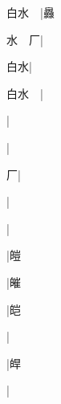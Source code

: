 \begin{multicols}{2}
{{\cjk{}白水{\cnsym{}　}}|{\cjk{}灥}\par
{\cjk{}水{\cnsym{}　}厂}|{}\par
{\cjk{}{\cnsym{}　}白水}|{}\par
{\cjk{}白水{\cnsym{}　}}|{}\par
{\cjk{}{\cnsym{}　}{\cnsym{}　}{\cnsym{}　}}|{}\par
{\cjk{}{\cnsym{}　}{\cnsym{}　}{\cnsym{}　}}|{}\par
{\cjk{}{\cnsym{}　}{\cnsym{}　}厂}|{}\par
{\cjk{}{\cnsym{}　}{\cnsym{}　}{\cnsym{}　}}|{}\par
{\cjk{}{\cnsym{}　}{\cnsym{}　}{\cnsym{}　}}|{}\par
{\cjk{}{\cnsym{}　}{\cnsym{}　}{\cnsym{}　}}|{\cjk{}皚}\par
{\cjk{}{\cnsym{}　}{\cnsym{}　}{\cnsym{}　}}|{\cjk{}皠}\par
{\cjk{}{\cnsym{}　}{\cnsym{}　}{\cnsym{}　}}|{\cjk{}皑}\par
{\cjk{}{\cnsym{}　}{\cnsym{}　}{\cnsym{}　}}|{}\par
{\cjk{}{\cnsym{}　}{\cnsym{}　}{\cnsym{}　}}|{\cjk{}皔}\par
{\cjk{}{\cnsym{}　}{\cnsym{}　}{\cnsym{}　}}|{}\par
}
\end{multicols}
